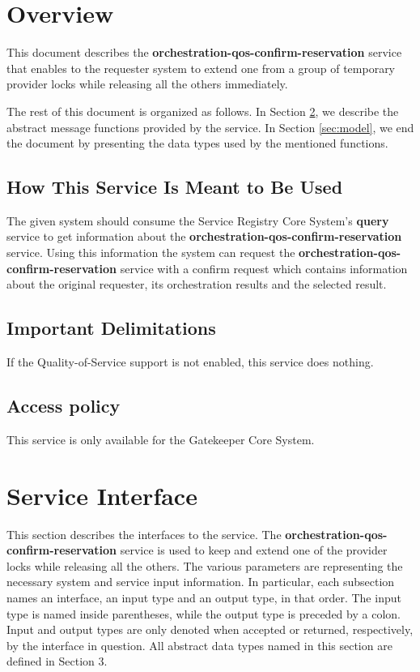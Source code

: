 \documentclass[a4paper]{arrowhead}
\begin{document}
\tableofcontents
\newpage

\section{Overview}
\label{sec:overview}
This document describes the \textbf{orchestration-qos-confirm-reservation} service that enables to the requester system to extend one from a group of temporary provider locks while releasing all the others immediately. 

The rest of this document is organized as follows.
In Section \ref{sec:functions}, we describe the abstract message functions provided by the service.
In Section \ref{sec:model}, we end the document by presenting the data types used by the mentioned functions.

\subsection{How This Service Is Meant to Be Used}
The given system should consume the Service Registry Core System's \textbf{query} service to get information about the \textbf{orchestration-qos-confirm-reservation} service. Using this information the system can request the \textbf{orchestration-qos-confirm-reservation} service with a confirm request which contains information about the original requester, its orchestration results and the selected result.

\subsection{Important Delimitations}
\label{sec:delimitations}

If the Quality-of-Service support is not enabled, this service does nothing.

\subsection{Access policy}
\label{sec:accesspolicy}

This service is only available for the Gatekeeper Core System.

\newpage

\section{Service Interface}
\label{sec:functions}

This section describes the interfaces to the service. The \textbf{orchestration-qos-confirm-reservation} service is used to keep and extend one of the provider locks while releasing all the others. The various parameters are representing the necessary system and service input information.
In particular, each subsection names an interface, an input type and an output type, in that order.
The input type is named inside parentheses, while the output type is preceded by a colon.
Input and output types are only denoted when accepted or returned, respectively, by the interface in question. All abstract data types named in this section are defined in Section 3.
\end{document}
